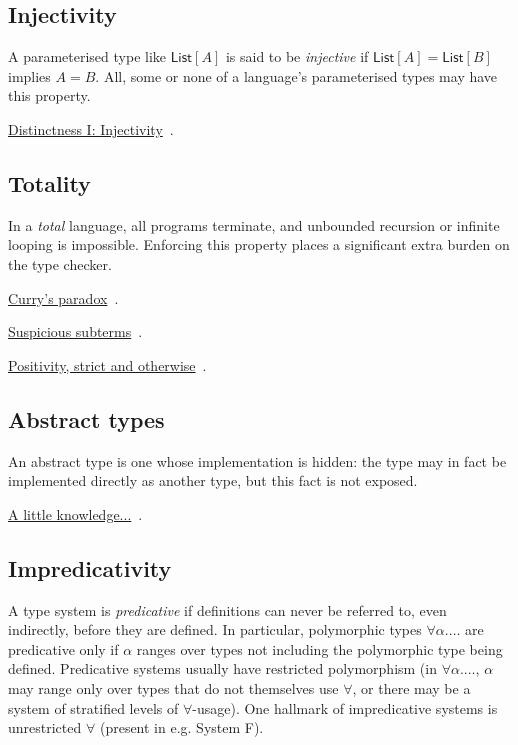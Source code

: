 \documentclass[11pt,oneside]{article}
\newenvironment{indexlist}
  {\par\vspace{0.3\baselineskip}\begingroup
   \setlength{\parindent}{0pt}\setlength{\parskip}{1pt}\small}
  {\endgroup\par\vspace{0.2\baselineskip}}
\newcommand{\indexitem}[2]{%
  \makebox[1.2em]{}\hyperref[#1]{#2}%
  \nobreak\hspace{0.4em}\textcolor{sageline}{\leaders\hbox{\,.\,}\hfill}%
  \hspace{0.4em}\nobreak\textcolor{stone}{\pageref{#1}}\par}
\begin{document}
\subsection*{Injectivity}\label{gloss:injectivity}
A parameterised type like \(\mathsf{List}[A]\) is said to be \emph{injective} if \(\mathsf{List}[A] = \mathsf{List}[B]\) implies \(A = B\). All, some or none of a language's parameterised types may have this property.

\begin{indexlist}
\indexitem{ce:distinctness-injectivity}{Distinctness I: Injectivity}
\end{indexlist}

\subsection*{Totality}\label{gloss:totality}
In a \emph{total} language, all programs terminate, and unbounded recursion or infinite looping is impossible. Enforcing this property places a significant extra burden on the type checker.

\begin{indexlist}
\indexitem{ce:currys-paradox}{Curry's paradox}
\indexitem{ce:suspicious-subterms}{Suspicious subterms}
\indexitem{ce:strict-positivity}{Positivity, strict and otherwise}
\end{indexlist}

\subsection*{Abstract types}\label{gloss:abstract-types}
An abstract type is one whose implementation is hidden: the type may in fact be implemented directly as another type, but this fact is not exposed.

\begin{indexlist}
\indexitem{ce:little-knowledge}{A little knowledge...}
\end{indexlist}

\subsection*{Impredicativity}\label{gloss:impredicativity}
A type system is \emph{predicative} if definitions can never be referred to, even indirectly,   before they are defined. In particular, polymorphic types \(∀α. \dots\) are predicative only if \(α\) ranges over types not including the polymorphic type being defined. Predicative systems usually have restricted polymorphism (in \(∀α. \dots\), \(α\) may range only over types that do not themselves use \(∀\), or there may be a system of stratified levels of \(∀\)-usage). One hallmark of impredicative systems is unrestricted \(∀\) (present in e.g. System F).
\end{document}
